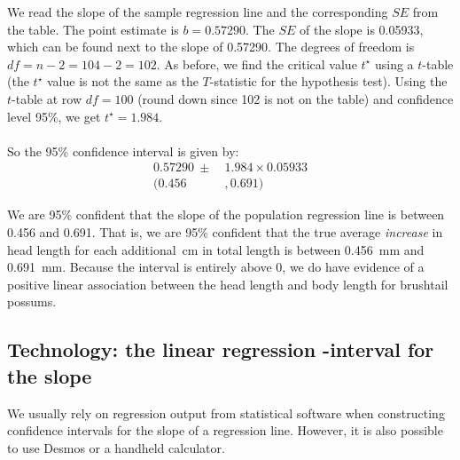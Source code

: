 \begin{examplewrap}
\begin{nexample}
\begin{description}
We read the slope of the sample regression line and the corresponding $SE$ from the table.  The point estimate is $b = 0.57290$.  The $SE$ of the slope is 0.05933, which can be found next to the slope of 0.57290.  The degrees of freedom is $df=n-2=104-2=102$.  As before, we find the critical value $t^{\star}$ using a $t$-table (the $t^{\star}$ value is not the same as the $T$-statistic for the hypothesis test).   Using the $t$-table at row $df = 100$ (round down since 102 is not on the table) and confidence level 95\%, we get $t^{\star}=1.984$.  
\\
\\
So the 95\% confidence interval is given by:
\begin{align*}
0.57290 \ \pm\  &1.984\times  0.05933\\
 (0.456&, 0.691)
\end{align*}
\item[\inferencestep{Conclude}]  We are 95\% confident that the slope of the population regression line is between 0.456 and 0.691.  That is, we are 95\% confident that the true average \emph{increase} in head length for each additional~cm in total length is between 0.456~mm and 0.691~mm.  Because the interval is entirely above 0, we do have evidence of a positive linear association between the head length and body length for brushtail possums.  
\end{description}


\end{nexample}
\end{examplewrap}



\D{\newpage}

\subsection[Technology: the $t$-interval for the slope]{Technology: the linear regression -interval for the slope}

\noindent We usually rely on regression output from statistical software when constructing confidence intervals for the slope of a regression line.  However, it is also possible to use Desmos or a handheld calculator.\\

